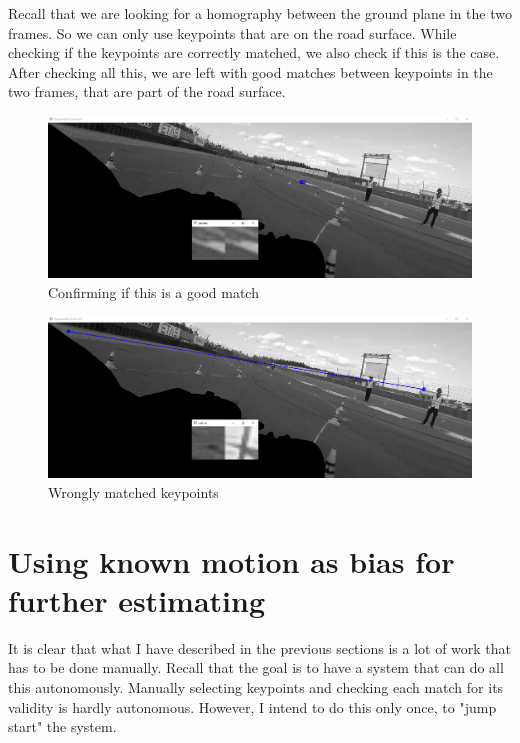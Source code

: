 Recall that we are looking for a homography between the ground plane in the two frames. So we can only use keypoints that are on the road surface. While checking if the keypoints are correctly matched, we also check if this is the case. After checking all this, we are left with good matches between keypoints in the two frames, that are part of the road surface.

\begin{figure}
    \centering
    \includegraphics[width=\textwidth]{figures/match_checking.png}
    \caption{Confirming if this is a good match}
    \label{fig:match_check}
\end{figure}
\begin{figure}
    \centering
    \includegraphics[width=\textwidth]{figures/match_checking_bad.png}
    \caption{Wrongly matched keypoints}
    \label{fig:bad_match}
\end{figure}

\section{Using known motion as bias for further estimating}
It is clear that what I have described in the previous sections is a lot of work that has to be done manually. Recall that the goal is to have a system that can do all this autonomously. Manually selecting keypoints and checking each match for its validity is hardly autonomous. However, I intend to do this only once, to "jump start" the system.\bigskip 

